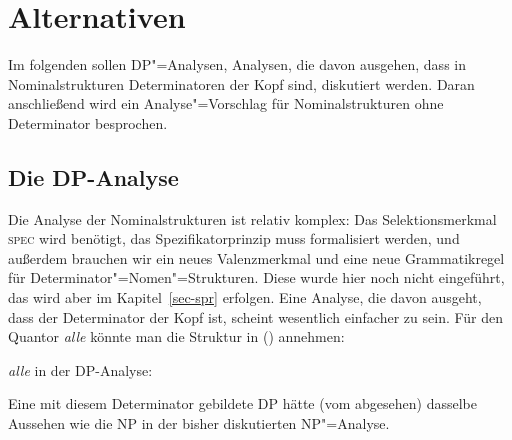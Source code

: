 

\section{Alternativen}

Im folgenden sollen DP"=Analysen, \dash Analysen, die davon ausgehen, dass in Nominalstrukturen
Determinatoren der Kopf sind, diskutiert werden. Daran anschließend wird ein Analyse"=Vorschlag
für Nominalstrukturen ohne Determinator besprochen.

\subsection{Die DP-Analyse}
\label{sec-dp-analyse}

\mbox{}%
Die Analyse der Nominalstrukturen ist relativ komplex: Das Selektionsmerkmal \textsc{spec} wird benötigt,
das Spezifikatorprinzip muss formalisiert werden, und außerdem brauchen wir ein neues
Valenzmerkmal und eine neue Grammatikregel für Determinator"=Nomen"=Strukturen.
Diese wurde hier noch nicht eingeführt, das wird aber im Kapitel~\ref{sec-spr}
erfolgen. Eine Analyse, die davon ausgeht, dass der Determinator der Kopf ist, scheint wesentlich
einfacher zu sein. Für den Quantor \emph{alle} könnte man die Struktur in () annehmen:

\eas
\emph{alle} in der DP-Analyse:\\
\zs

\noindent
Eine mit diesem Determinator gebildete DP hätte (vom \headw abgesehen) dasselbe Aussehen
wie die NP in der bisher diskutierten NP"=Analyse.

